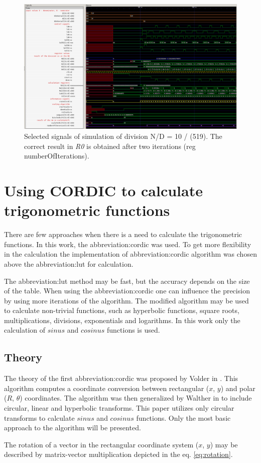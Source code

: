 \documentclass[a4paper, twoside, 11pt]{article}
\begin{document}
\begin{figure}[htbp!]
  \centering
  \includegraphics[width=1\textwidth]{src/png/division-10-div-519.png}
    \caption{Selected signals of simulation of division N/D = 10 / (519). The correct result in \textit{R0} is obtained after two iterations (reg numberOfIterations).}
  \label{fig:division-10-div-519}
\end{figure}

\section{Using CORDIC to calculate trigonometric functions}
    There are few approaches when there is a need to calculate the trigonometric functions. In this work, the \gls{abbreviation:cordic} was used. To get more flexibility in the calculation the implementation of \gls{abbreviation:cordic} algorithm was chosen above the \gls{abbreviation:lut} for calculation.\par
    The \gls{abbreviation:lut} method may be fast, but the accuracy depends on the size of the table. When using the \gls{abbreviation:cordic} one can influence the precision by using more iterations of the algorithm. The modified algorithm may be used to calculate non-trivial functions, such as hyperbolic functions, square roots, multiplications, divisions, exponentials and logarithms. \cite{base-digital-signal-processing-with-field-programmable-gate-arrays} In this work only the calculation of $sinus$ and $cosinus$ functions is used.
    \subsection{Theory}\label{subsec:cordic-theory}
        The theory of the first \gls{abbreviation:cordic} was proposed by Volder in \cite{volder-cordic-trigonomtric-computing-technique}. This algorithm computes a coordinate conversion between rectangular ($x$, $y$) and polar ($R$, $\theta$) coordinates. The algorithm was then generalized by Walther in \cite{walther-a-unified-algorithm-for-elementary-functions} to include circular, linear and hyperbolic transforms. This paper utilizes only circular transforms to calculate $sinus$ and $cosinus$ functions. Only the most basic approach to the algorithm will be presented.\par
        The rotation of a vector in the rectangular coordinate system ($x$, $y$) may be described by matrix-vector multiplication depicted in the eq. \ref{eq:rotation}.
\end{document}

